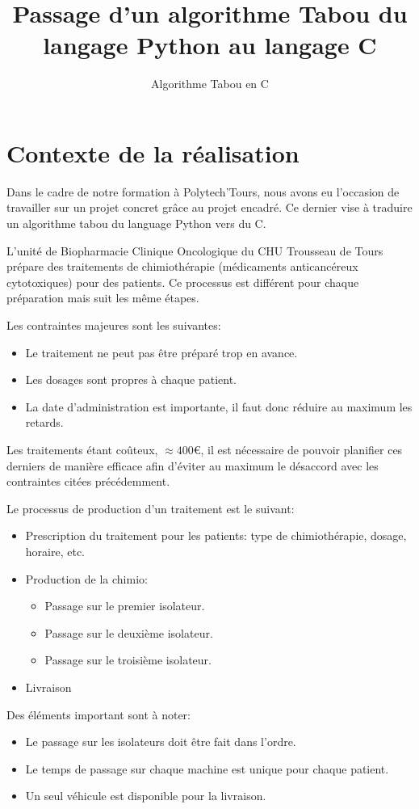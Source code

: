 \documentclass[hideweeklyreports]{polytech/polytech}
\title{Passage d'un algorithme Tabou du langage Python au langage C}
\subtitle{Algorithme Tabou en C}
\begin{document}
	\chapter{Contexte de la réalisation}
		Dans le cadre de notre formation à Polytech'Tours, nous avons eu l'occasion de travailler sur un projet concret grâce au projet encadré. Ce dernier vise à traduire un algorithme tabou du language Python vers du C.
		
		L'unité de Biopharmacie Clinique Oncologique du CHU Trousseau de Tours prépare des traitements de chimiothérapie (médicaments anticancéreux cytotoxiques) pour des patients. Ce processus est différent pour chaque préparation mais suit les même étapes.
		
		Les contraintes majeures sont les suivantes:
		\begin{itemize}
			\item Le traitement ne peut pas être préparé trop en avance.
			\item Les dosages sont propres à chaque patient.
			\item La date d'administration est importante, il faut donc réduire au maximum les retards.
		\end{itemize}
		
		Les traitements étant coûteux, $\approx 400$€, il est nécessaire de pouvoir planifier ces derniers de manière efficace afin d'éviter au maximum le désaccord avec les contraintes citées précédemment.
		
		Le processus de production d'un traitement est le suivant:
		\begin{itemize}
			\item Prescription du traitement pour les patients: type de chimiothérapie, dosage, horaire, etc.
			\item Production de la chimio:
				\begin{itemize}
					\item Passage sur le premier isolateur.
					\item Passage sur le deuxième isolateur.
					\item Passage sur le troisième isolateur.
				\end{itemize}
			\item Livraison
		\end{itemize}
		
		Des éléments important sont à noter:
		\begin{itemize}
			\item Le passage sur les isolateurs doit être fait dans l'ordre.
			\item Le temps de passage sur chaque machine est unique pour chaque patient.
			\item Un seul véhicule est disponible pour la livraison.
		\end{itemize}
		
\end{document}
